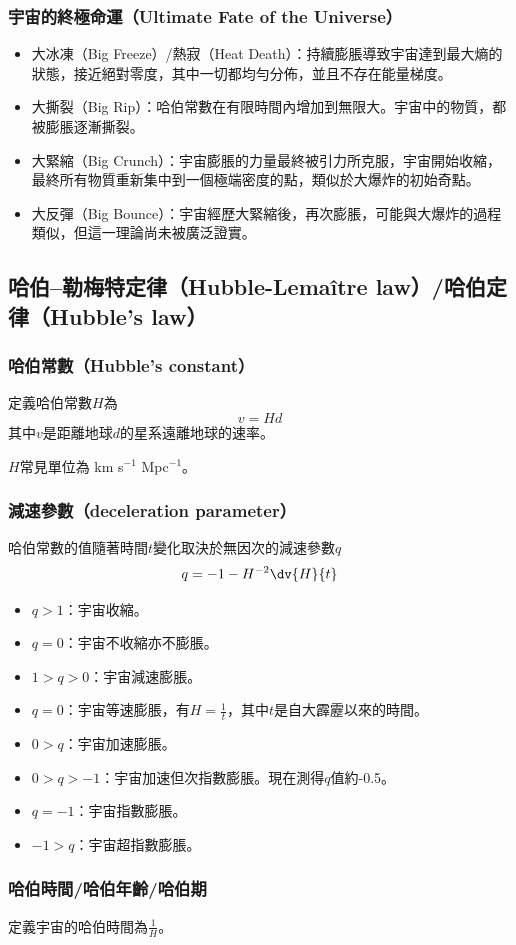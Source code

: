 \documentclass[a4paper,12pt]{report}
\begin{document}
\subsubsection{宇宙的終極命運（Ultimate Fate of the Universe）}
\begin{itemize}
\item 大冰凍（Big Freeze）/熱寂（Heat Death）：持續膨脹導致宇宙達到最大熵的狀態，接近絕對零度，其中一切都均勻分佈，並且不存在能量梯度。
\item 大撕裂（Big Rip）：哈伯常數在有限時間內增加到無限大。宇宙中的物質，都被膨脹逐漸撕裂。
\item 大緊縮（Big Crunch）：宇宙膨脹的力量最終被引力所克服，宇宙開始收縮，最終所有物質重新集中到一個極端密度的點，類似於大爆炸的初始奇點。
\item 大反彈（Big Bounce）：宇宙經歷大緊縮後，再次膨脹，可能與大爆炸的過程類似，但這一理論尚未被廣泛證實。
\end{itemize}
\subsection{哈伯–勒梅特定律（Hubble-Lemaître law）/哈伯定律（Hubble's law）}
\subsubsection{哈伯常數（Hubble's constant）}
定義哈伯常數$H$為
\[v=Hd\]
其中$v$是距離地球$d$的星系遠離地球的速率。

$H$常見單位為 km s$^{-1}$ Mpc$^{-1}$。
\subsubsection{減速參數（deceleration parameter）}
哈伯常數的值隨著時間$t$變化取決於無因次的減速參數$q$
\[q=-1-H^{-2}\dv{H}{t}\]
\begin{itemize}
\item $q>1$：宇宙收縮。
\item $q=0$：宇宙不收縮亦不膨脹。
\item $1>q>0$：宇宙減速膨脹。
\item $q=0$：宇宙等速膨脹，有$H = \frac{1}{t}$，其中$t$是自大霹靂以來的時間。
\item $0>q$：宇宙加速膨脹。
\item $0>q>-1$：宇宙加速但次指數膨脹。現在測得$q$值約-0.5。
\item $q=-1$：宇宙指數膨脹。
\item $-1>q$：宇宙超指數膨脹。
\end{itemize}
\subsubsection{哈伯時間/哈伯年齡/哈伯期}
定義宇宙的哈伯時間為$\frac{1}{H}$。
\end{document}
